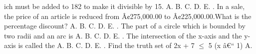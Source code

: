 \documentclass{article}
\begin{document}
\begin{multicols}{2}
ich must be added to 182 to make it divisible by 15. \newline \indent A. \newline \indent B. \newline \indent C. \newline \indent D. \newline \indent E.  \newline{}. In a sale, the price of an article is reduced from Â¢275,000.00 to Â¢225,000.00.What is the percentage discount? \newline \indent A. \newline \indent B. \newline \indent C. \newline \indent D. \newline \indent E.  \newline{}. The part of a circle which is bounded by two radii and an arc is \newline \indent A. \newline \indent B. \newline \indent C. \newline \indent D. \newline \indent E.  \newline{}. The intersection of the x-axis and the y-axis is called the \newline \indent A. \newline \indent B. \newline \indent C. \newline \indent D. \newline \indent E.  \newline{}.  Find the truth set of 2x + 7 \(\le\) 5 (x â€“ 1) \newline \indent A. \n
\end{multicols}
\end{document}
